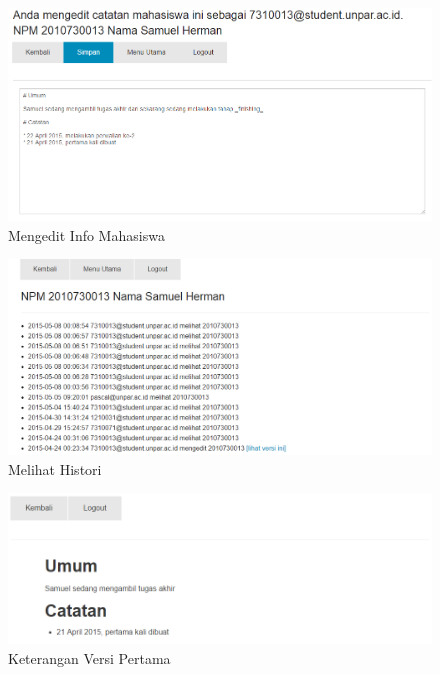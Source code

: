 \begin{figure}[H]
\centering
\includegraphics[scale=0.5]{Gambar/pengujian10.png}
\caption[Mengedit Info Mahasiswa]{Mengedit Info Mahasiswa} 
\label{fig:mengeditinfomahasiswa}
\end{figure}

\begin{figure}[H]
\centering
\includegraphics[scale=0.5]{Gambar/pengujian11.png}
\caption[Melihat Histori]{Melihat Histori} 
\label{fig:melihathistori}
\end{figure}

\begin{figure}[H]
\centering
\includegraphics[scale=0.5]{Gambar/pengujian12.png}
\caption[Keterangan Versi Pertama]{Keterangan Versi Pertama} 
\label{fig:keteranganversipertama}
\end{figure}


